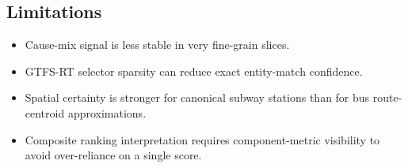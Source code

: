 \subsection{Limitations}
\begin{itemize}
    \item Cause-mix signal is less stable in very fine-grain slices.
    \item GTFS-RT selector sparsity can reduce exact entity-match confidence.
    \item Spatial certainty is stronger for canonical subway stations than for bus route-centroid approximations.
    \item Composite ranking interpretation requires component-metric visibility to avoid over-reliance on a single score.
\end{itemize}
